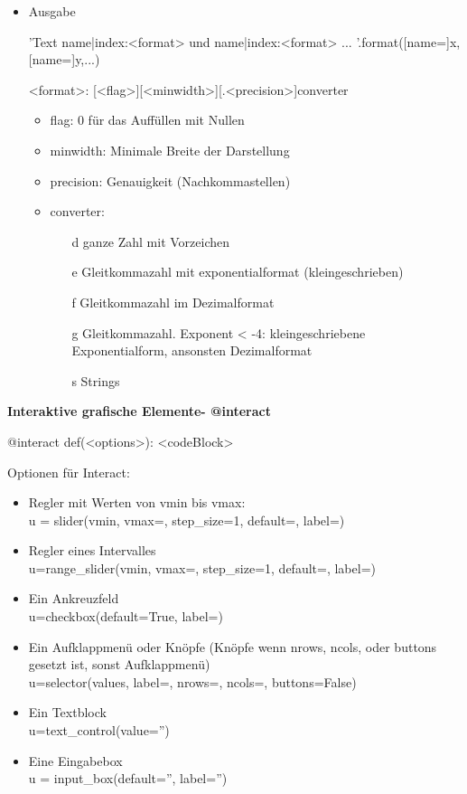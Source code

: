 \documentclass[a4paper,9pt,DIV15]{scrartcl}
\begin{document}
\begin{itemize}
\begin{sagein}
\end{sagein}
\item Ausgabe
\begin{sagein}
'Text {name|index:<format>} und {name|index:<format>} ... '.format([name=]x,[name=]y,...)
 \end{sagein}
 <format>:  {[<flag>][<minwidth>][.<precision>]converter}
 \begin{itemize}
\item flag: 0 für das Auffüllen mit Nullen
\item minwidth: Minimale Breite der Darstellung
\item precision: Genauigkeit (Nachkommastellen)
\item converter:
    \begin{itemize}
        \item[d]  ganze Zahl mit Vorzeichen
        \item[e]  Gleitkommazahl mit exponentialformat (kleingeschrieben)
        \item[f]  Gleitkommazahl im Dezimalformat
        \item[g]  Gleitkommazahl. Exponent < -4: kleingeschriebene Exponentialform, ansonsten Dezimalformat
        \item[s]  Strings
    \end{itemize}
 \end{itemize}

\end{itemize}
\pagebreak
\textbf{Interaktive grafische Elemente- @interact}
\begin{sagein}
@interact
def(<options>):
	<codeBlock>
\end{sagein}
Optionen f\"ur Interact:
\begin{itemize}
	\item Regler mit Werten von vmin bis vmax:\\
		u = slider(vmin, vmax=, step\_size=1, default=, label=)
	\item Regler eines Intervalles\\
		u=range\_slider(vmin, vmax=, step\_size=1, default=, label=)
	\item Ein Ankreuzfeld\\
		u=checkbox(default=True, label=)
	\item Ein Aufklappmenü oder Knöpfe (Knöpfe wenn nrows, ncols, oder buttons gesetzt ist, sonst Aufklappmenü)\\
		u=selector(values, label=, nrows=, ncols=, buttons=False)
	\item Ein Textblock\\
		u=text\_control(value='')
	\item Eine Eingabebox\\
		u = input\_box(default='', label='')
\end{itemize}
\end{document}
